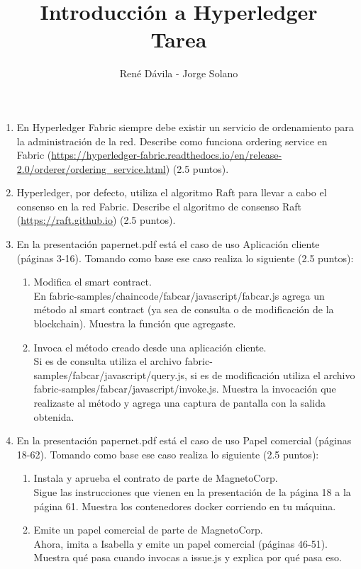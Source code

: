 \documentclass[12pt]{article}
\title{Introducción a Hyperledger\\Tarea}
\author{René Dávila - Jorge Solano}
\date{ }
\begin{document}
	\maketitle
	
	\begin{enumerate}
		\item En Hyperledger Fabric siempre debe existir un servicio de ordenamiento para la administración de la red. Describe como funciona ordering service en Fabric (\url{https://hyperledger-fabric.readthedocs.io/en/release-2.0/orderer/ordering\_service.html}) (2.5 puntos).
		
		\item Hyperledger, por defecto, utiliza el algoritmo Raft para llevar a cabo el consenso en la red Fabric. Describe el algoritmo de consenso Raft (\url{https://raft.github.io}) (2.5 puntos).
		
		\item En la presentación papernet.pdf está el caso de uso Aplicación cliente (páginas 3-16). Tomando como base ese caso realiza lo siguiente (2.5 puntos):
		\begin{enumerate}
			\item Modifica el smart contract.\\
			En fabric-samples/chaincode/fabcar/javascript/fabcar.js agrega un método al smart contract (ya sea de consulta o de modificación de la blockchain). Muestra la función que agregaste.
			\item Invoca el método creado desde una aplicación cliente.\\
			Si es de consulta utiliza el archivo fabric-samples/fabcar/javascript/query.js, si es de modificación utiliza el archivo fabric-samples/fabcar/javascript/invoke.js. Muestra la invocación que realizaste al método y agrega una captura de pantalla con la salida obtenida.
		\end{enumerate}
	
		\item En la presentación papernet.pdf está el caso de uso Papel comercial (páginas 18-62). Tomando como base ese caso realiza lo siguiente (2.5 puntos):
		\begin{enumerate}
			\item Instala y aprueba el contrato de parte de MagnetoCorp.\\
			Sigue las instrucciones que vienen en la presentación de la página 18 a la página 61. Muestra los contenedores docker corriendo en tu máquina.
			\item Emite un papel comercial de parte de MagnetoCorp.\\
			Ahora, imita a Isabella y emite un papel comercial (páginas 46-51). Muestra qué pasa cuando invocas a issue.js y explica por qué pasa eso.
		\end{enumerate}
	\end{enumerate}
\end{document}
